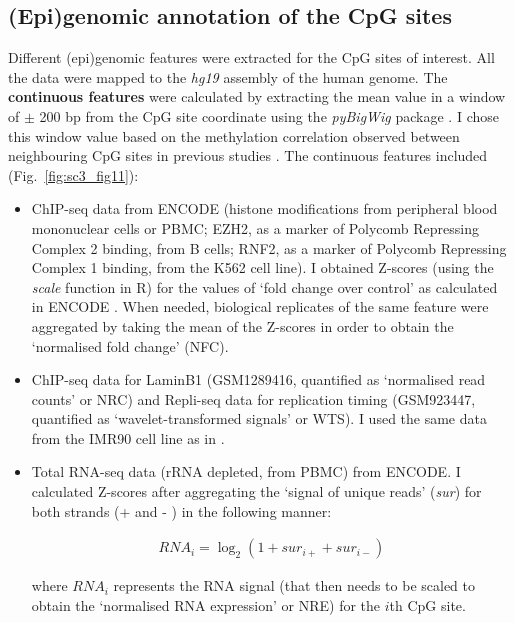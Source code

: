 \subsection*{(Epi)genomic annotation of the CpG sites}

Different (epi)genomic features were extracted for the CpG sites of interest. All the data were mapped to the \textit{hg19} assembly of the human genome.
The \textbf{continuous features} were calculated by extracting the mean value in a window of $\pm$ 200 bp from the CpG site coordinate using the \textit{pyBigWig} package \cite{Richter}. I chose this window value based on the methylation correlation observed between neighbouring CpG sites in previous studies \cite{Zhang2015}. The continuous features included (Fig.~\ref{fig:sc3_fig11}):

\begin{itemize}
	
	\item ChIP-seq data from ENCODE (histone modifications from peripheral blood mononuclear cells or \acrshort{PBMC}; EZH2, as a marker of Polycomb Repressing Complex 2 binding, from B cells; RNF2, as a marker of Polycomb Repressing Complex 1 binding, from the K562 cell line). I obtained Z-scores (using the \textit{scale} function in R) for the values of `fold change over control' as calculated in ENCODE \cite{Consortium2012}. When needed, biological replicates of the same feature were aggregated by taking the mean of the Z-scores in order to obtain the `normalised fold change' (\acrshort{NFC}).
	
	\item ChIP-seq data for LaminB1 (GSM1289416, quantified as `normalised read counts' or \acrshort{NRC}) and \acrshort{Repli-seq} data for replication timing (GSM923447, quantified as `wavelet-transformed signals' or \acrshort{WTS}). I used the same data from the IMR90 cell line as in \cite{Zhou2018}.
	
	\item Total RNA-seq data (\acrshort{rRNA} depleted, from PBMC) from ENCODE. I calculated Z-scores after aggregating the `signal of unique reads' (\textit{\acrshort{sur}}) for both strands (+ and - ) in the following manner:
	
	\begin{align}
	RNA_i = \log_2(1 + sur_{i+} + sur_{i-})
	\end{align}
	
	where $RNA_i$ represents the RNA signal (that then needs to be scaled to obtain the `normalised RNA expression' or \acrshort{NRE}) for the $i$th CpG site.
	
\end{itemize}

